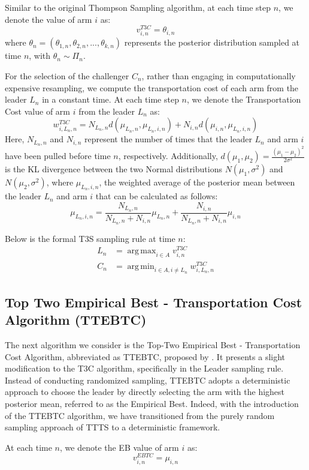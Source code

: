 \documentclass[a4paper, 12pt]{article}
\DeclareMathOperator{\argmax}{arg\,max}
\DeclareMathOperator{\argmin}{arg\,min}
\theoremstyle{definition}
\begin{document}
Similar to the original Thompson Sampling algorithm, at each time step $n$, we denote the value of arm $i$ as:
\[
v_{i,n}^{T3C} = \theta_{i,n}   
\]
where $\theta_n = (\theta_{1,n},\theta_{2,n}, ..., \theta_{k,n})$ represents the posterior distribution sampled at time $n$, with $\theta_{n}\sim \Pi_n$.

For the selection of the challenger $C_n$, rather than engaging in computationally expensive resampling, we compute the transportation cost of each arm from the leader $L_n$ in a constant time. At each time step $n$, we denote the Transportation Cost value of arm $i$ from the leader $L_n$ as:
\[
w_{i,L_n,n}^{T3C} = N_{L_n,n} d(\mu_{L_n,n},\mu_{L_n,i,n})+ N_{i,n} d(\mu_{i,n},\mu_{L_n,i,n})     
\]
Here, $N_{L_n,n}$ and $N_{i,n}$ represent the number of times that the leader $L_n$ and arm $i$ have been pulled before time $n$, respectively. Additionally, $d(\mu_1,\mu_2) = \frac{(\mu_1 - \mu_2)^2}{2\sigma^2}$ is the KL divergence between the two Normal distributions $N(\mu_1,\sigma^2)$ and $N(\mu_2,\sigma^2)$, where $\mu_{L_n,i,n}$, the weighted average of the posterior mean between the leader $L_n$ and arm $i$ that can be calculated as follows:
\[
\mu_{L_n,i,n} = \frac{N_{L_n,n}}{N_{L_n,n}+N_{i,n}} \mu_{L_n,n} + \frac{N_{i,n}}{N_{L_n,n}+N_{i,n}} \mu_{i,n}  
\]

Below is the formal T3S sampling rule at time $n$:
\begin{align} \label{eq:t3c}
L_n & = \argmax_{i\in A} v_{i,n}^{T3C} \nonumber \\
C_n & = \argmin_{i\in A,i\neq L_n} w_{i,L_n,n}^{T3C}
\end{align}


\subsection{Top Two Empirical Best - Transportation Cost Algorithm (TTEBTC)}
The next algorithm we consider is the Top-Two Empirical Best - Transportation Cost Algorithm, abbreviated as TTEBTC, proposed by \cite{ttebtc}. It presents a slight modification to the T3C algorithm, specifically in the Leader sampling rule. Instead of conducting randomized sampling, TTEBTC adopts a deterministic approach to choose the leader by directly selecting the arm with the highest posterior mean, referred to as the Empirical Best. Indeed, with the introduction of the TTEBTC algorithm, we have transitioned from the purely random sampling approach of TTTS to a deterministic framework.

At each time $n$, we denote the EB value of arm $i$ as:
\[
v_{i,n}^{EBTC} = \mu_{i,n}   
\]
\end{document}
